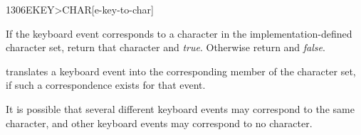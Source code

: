 \vspace*{-2ex}\enlargethispage{8ex}
\begin{worddef}[EKEYtoCHAR]{1306}{EKEY>CHAR}[e-key-to-char]
\item {}

	If the keyboard event  corresponds to a character in the
	implementation-defined character set, return that character and
	\emph{true}. Otherwise return  and \emph{false}.

	\begin{rationale} %
		 translates a keyboard event into the
		corresponding member of the character set, if such a
		correspondence exists for that event.

		It is possible that several different keyboard events may
		correspond to the same character, and other keyboard events
		may correspond to no character.
	\end{rationale}
\end{worddef}



